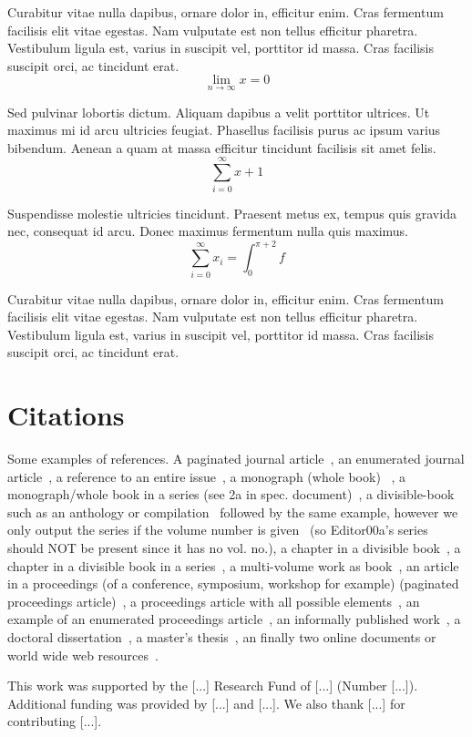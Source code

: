 \documentclass[sigconf, nonacm]{acmart}
\begin{document}
Curabitur vitae nulla dapibus, ornare dolor in, efficitur enim. Cras fermentum facilisis elit vitae egestas. Nam vulputate est non tellus efficitur pharetra. Vestibulum ligula est, varius in suscipit vel, porttitor id massa. Cras facilisis suscipit orci, ac tincidunt erat.
\begin{equation}
  \lim_{n\rightarrow \infty}x=0
\end{equation}

Sed pulvinar lobortis dictum. Aliquam dapibus a velit porttitor ultrices. Ut maximus mi id arcu ultricies feugiat. Phasellus facilisis purus ac ipsum varius bibendum. Aenean a quam at massa efficitur tincidunt facilisis sit amet felis. 
\begin{displaymath}
  \sum_{i=0}^{\infty} x + 1
\end{displaymath}

Suspendisse molestie ultricies tincidunt. Praesent metus ex, tempus quis gravida nec, consequat id arcu. Donec maximus fermentum nulla quis maximus.
\begin{equation}
  \sum_{i=0}^{\infty}x_i=\int_{0}^{\pi+2} f
\end{equation}

Curabitur vitae nulla dapibus, ornare dolor in, efficitur enim. Cras fermentum facilisis elit vitae egestas. Nam vulputate est non tellus efficitur pharetra. Vestibulum ligula est, varius in suscipit vel, porttitor id massa. Cras facilisis suscipit orci, ac tincidunt erat.

\section{Citations}

Some examples of references. A paginated journal article~\cite{Abril07}, an enumerated journal article~\cite{Cohen07}, a reference to an entire issue~\cite{JCohen96}, a monograph (whole book) ~\cite{Kosiur01}, a monograph/whole book in a series (see 2a in spec. document)~\cite{Harel79}, a divisible-book such as an anthology or compilation~\cite{Editor00} followed by the same example, however we only output the series if the volume number is given~\cite{Editor00a} (so Editor00a's series should NOT be present since it has no vol. no.), a chapter in a divisible book~\cite{Spector90}, a chapter in a divisible book in a series~\cite{Douglass98}, a multi-volume work as book~\cite{Knuth97}, an article in a proceedings (of a conference, symposium, workshop for example) (paginated proceedings article)~\cite{Andler79}, a proceedings article with all possible elements~\cite{Smith10}, an example of an enumerated proceedings article~\cite{VanGundy07}, an informally published work~\cite{Harel78}, a doctoral dissertation~\cite{Clarkson85}, a master's thesis~\cite{anisi03}, an finally two online documents or world wide web resources~\cite{Thornburg01, Ablamowicz07}.

\begin{acks}
 This work was supported by the [...] Research Fund of [...] (Number [...]). Additional funding was provided by [...] and [...]. We also thank [...] for contributing [...].
\end{acks}




\end{document}
